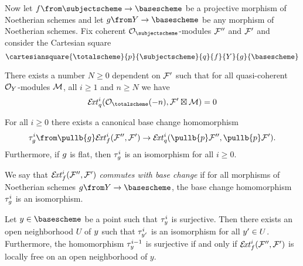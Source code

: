 Now let $\subjecttobase \from \subjectscheme \to \basescheme$ be a projective morphism of Noetherian schemes and let $g \from \basechangescheme \to \basescheme$ be any morphism of Noetherian schemes. Fix coherent $\mathcal{O}_\subjectscheme$-modules $\mathcal{F}''$ and $\mathcal{F}'$ and consider the Cartesian square
\[
 	\cartesiansquare{\totalscheme}{\totaltosubject}{\subjectscheme}{\totaltobasechange}{\subjecttobase}{\basechangescheme}{\basechangetobase}{\basescheme}
\]

\begin{proposition}
	There exists a number $N\geq 0$ dependent on $\mathcal{F}'$ such that for all quasi-coherent $\mathcal{O}_Y$-modules $\mathcal{M}$, all $i\geq 1$ and $n\geq N$ we have
	\[
		\EXT^i_{\totaltobasechange}(\mathcal{O}_\totalscheme(-n),\extendingsubjectmodule\boxtimes \basechangemodule) = 0
	\]
\end{proposition}

\begin{proposition}
	For all $i\geq 0$ there exists a canonical base change homomorphism
	\[
		\tau^i_{\basechangetobase} \from \pullb{\basechangetobase}\EXT^i_{\subjecttobase}
		(\extendedsubjectmodule, \extendingsubjectmodule)
		\to
		\EXT^i_{\totaltobasechange}
		(\pullb{\totaltosubject}\extendedsubjectmodule, \pullb{\totaltosubject}\extendingsubjectmodule).
	\]
	Furthermore, if $g$ is flat, then $\tau^i_g$ is an isomorphism for all $i\geq 0$.
\end{proposition}

\begin{definition}
	We say that $\mathcal{E}\!\mathit{xt}^i_f(\mathcal{F}'', \mathcal{F}')$ \emph{commutes with base change} if for all morphisms of Noetherian schemes $\basechangetobase \from \basechangescheme \to \basescheme$, the base change homomorphism $\tau^i_g$ is an isomorphism.
\end{definition}

\begin{proposition}
	Let $\basepoint \in \basescheme$ be a point such that $\tau^i_y$ is surjective. Then there exists an open neighborhood $U$ of $y$ such that $\tau^i_{y'}$ is an isomorphism for all $y'\in U$.
	Furthermore, the homomorphism $\tau^{i-1}_{y}$ is surjective if and only if $\mathcal{E}\!\mathit{xt}^i_{f}(\mathcal{F}'',\mathcal{F}')$ is locally free on an open neighborhood of $y$.
\end{proposition}

